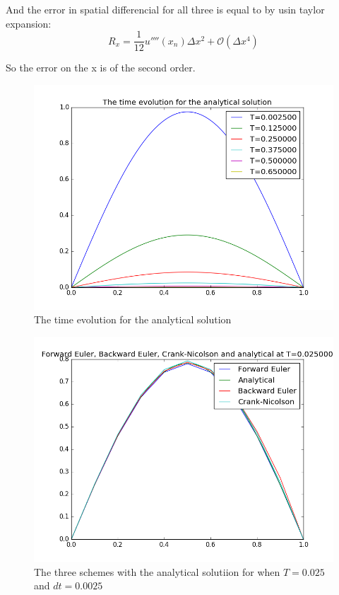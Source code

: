 \documentclass[a4paper,10pt]{article}
\begin{document}
And the error in spatial differencial for all three is equal to by usin taylor expansion:
\begin{equation}
 R_x = \frac{1}{12}u''''(x_n) \Delta x^2 + \mathcal{O}(\Delta x^4)
\end{equation}

So the error on the x is of the second order.



\begin{figure}
  \includegraphics[scale=0.5]{Time_evolution}
    \caption{The time evolution for the analytical solution}
    \label{fig:time_evo}
\end{figure}

\begin{figure}
  \includegraphics[scale=0.5]{numerical_analytcal_T0025}
    \caption{The three schemes with the analytical solutiion for when $T = 0.025$ and $dt = 0.0025$}
    \label{fig:NumAna0025}
\end{figure}
\end{document}
